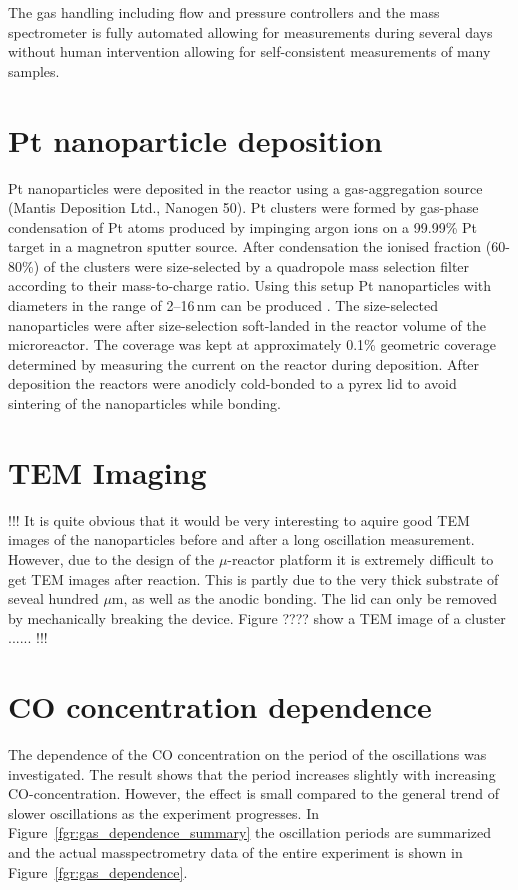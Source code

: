 \documentclass[8.5pt,twoside,twocolumn]{article}
\begin{document}
The gas handling including flow and pressure controllers and the mass spectrometer is fully automated allowing for measurements during several days without human intervention allowing for self-consistent measurements of many samples.

\section{Pt nanoparticle deposition}
Pt nanoparticles were deposited in the reactor using a gas-aggregation source (Mantis Deposition Ltd., Nanogen 50). Pt clusters were formed by gas-phase condensation of Pt atoms produced by impinging argon ions on a 99.99\% Pt target in a magnetron sputter source. After condensation the ionised fraction (60-80\%) of the clusters were size-selected by a quadropole mass selection filter according to their mass-to-charge ratio. Using this setup Pt nanoparticles with diameters in the range of 2--16\,nm can be produced \cite{Nielsen2010,Nielsen2009}. The size-selected nanoparticles were after size-selection soft-landed in the reactor volume of the microreactor. The coverage was kept at approximately 0.1\% geometric coverage determined by measuring the current on the reactor during deposition. After deposition the reactors were anodicly cold-bonded \cite{Vesborg2010} to a pyrex lid to avoid sintering of the nanoparticles while bonding.

\section{TEM Imaging}
!!! It is quite obvious that it would be very interesting to aquire good TEM images of the nanoparticles  before and after a long oscillation measurement. However, due to the design of the $\mu$-reactor platform it is extremely difficult to get TEM images after reaction. This is partly due to the very thick substrate of seveal hundred $\mu$m, as well as the anodic bonding. The lid can only be removed by mechanically breaking the device. Figure ???? show a TEM image of a cluster ...... !!!

\section{CO concentration dependence}
The dependence of the CO concentration on the period of the oscillations was investigated. The result shows that the period increases slightly with increasing CO-concentration. However, the effect is small compared to the general trend of slower oscillations as the experiment progresses. In Figure~\ref{fgr:gas_dependence_summary} the oscillation periods are summarized and the actual masspectrometry data of the entire experiment is shown in Figure~\ref{fgr:gas_dependence}.
\end{document}

